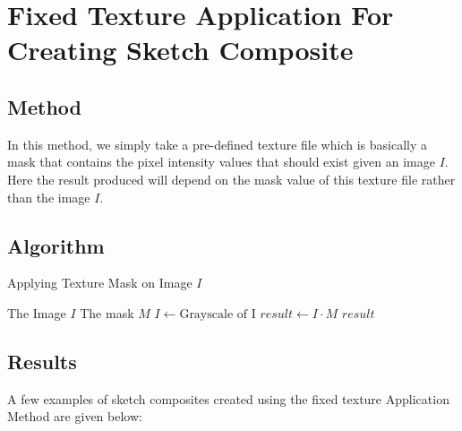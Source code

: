\documentclass{article}
\begin{document}
\clearpage
\section{Fixed Texture Application For Creating Sketch Composite}
\subsection{Method}
In this method, we simply take a pre-defined texture file which is basically a mask that contains the pixel intensity values that should exist given an image $I$. Here the result produced will depend on the 
mask value of this texture file rather than the image $I$.

\subsection{Algorithm}
\begin{algorithm}
\caption{Applying Texture Mask on Image $I$}
    \begin{algorithmic}
    \REQUIRE The Image $I$
    \REQUIRE The mask $M$
    \STATE {}
    \STATE $I \gets \text{Grayscale of I}$
    \STATE $result \gets I \cdot M$
    \RETURN $result$
    \end{algorithmic}
\end{algorithm}

\subsection{Results}
A few examples of sketch composites created using the fixed texture Application Method are given below:

\begin{figure}[ht]
    \centering
    \qquad
    \label{fig:texture-butterfly}%
\end{figure}

\begin{figure}[ht]
    \centering
    \qquad
    \label{fig:texture-dolphin-2}%
\end{figure}
\end{document}

